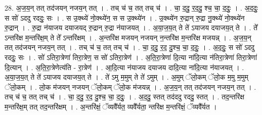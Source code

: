 \documentclass[17pt]{extarticle}
\begin{document}
28. अ॒ज॒य॒न् तत् तद॑जयन् नजय॒न् तत् । . तच् च॑ च॒ तत् तच् च॑ । . चा॒ द॒दु॒ र॒द॒दु॒ श्च॒ चा॒ द॒दुः॒ । . अ॒द॒दुः॒ स सो॑ ऽददु रददुः॒ सः । . स उ॒क्थ्ये॑ नो॒क्थ्ये॑न॒ स स उ॒क्थ्ये॑न । . उ॒क्थ्ये॑न रु॒द्रान् रु॒द्रा नु॒क्थ्ये॑ नो॒क्थ्ये॑न रु॒द्रान् । . रु॒द्रा न॑याजय दयाजयद् रु॒द्रान् रु॒द्रा न॑याजयत् । . अ॒या॒ज॒य॒त् ते ते॑ ऽयाजय दयाजय॒त् ते । . ते᳚ ऽन्तरि॑क्ष म॒न्तरि॑क्ष॒म् ते ते᳚ ऽन्तरि॑क्षम् । . अ॒न्तरि॑क्ष मजयन् नजयन् न॒न्तरि॑क्ष म॒न्तरि॑क्ष मजयन्न् । . अ॒ज॒य॒न् तत् तद॑जयन् नजय॒न् तत् । . तच् च॑ च॒ तत् तच् च॑ । . चा॒ द॒दु॒ र॒द॒ दु॒श्च॒ चा॒ द॒दुः॒ । . अ॒द॒दुः॒ स सो॑ ऽददु रददुः॒ सः । . सो॑ ऽतिरा॒त्रेणा॑ तिरा॒त्रेण॒ स सो॑ ऽतिरा॒त्रेण॑ । . अ॒ति॒रा॒त्रेणा॑ दि॒त्या ना॑दि॒त्या न॑तिरा॒त्रेणा॑ तिरा॒त्रेणा॑ दि॒त्यान् । . अ॒ति॒रा॒त्रेणेत्य॑ति - रा॒त्रेण॑ । . आ॒दि॒त्या न॑याजय दयाजय दादि॒त्या ना॑दि॒त्या न॑याजयत् । . अ॒या॒ज॒य॒त् ते ते॑ ऽयाजय दयाजय॒त् ते । . ते॑ ऽमु म॒मुम् ते ते॑ ऽमुम् । . अ॒मुम् ॅलो॒कम् ॅलो॒क म॒मु म॒मुम् ॅलो॒कम् । . लो॒क म॑जयन् नजयन् ॅलो॒कम् ॅलो॒क म॑जयन्न् । . अ॒ज॒य॒न् तत् तद॑जयन् नजय॒न् तत् । . तच् च॑ च॒ तत् तच् च॑ । . चा॒ द॒दु॒ र॒द॒ दु॒श्च॒ चा॒ द॒दुः॒ । . अ॒द॒दु॒ स्तत् तद॑ददु रददु॒ स्तत् । . तद॒न्तरि॑क्ष म॒न्तरि॑क्ष॒म् तत् तद॒न्तरि॑क्षम् । . अ॒न्तरि॑क्षं॒ ॅव्यवै᳚र्यत॒ व्यवै᳚र्यता॒ न्तरि॑क्ष म॒न्तरि॑क्षं॒ ॅव्यवै᳚र्यत । \newline
\end{document}
